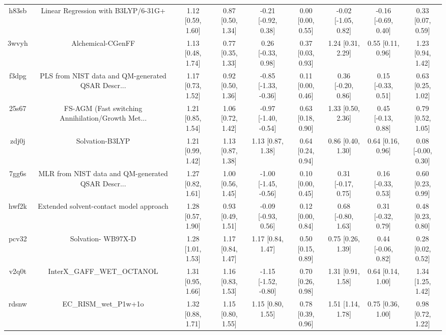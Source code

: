 \documentclass{article}
\begin{document}
\begin{center}
\begin{longtable}{|ccccccccc|}
 h83sb &                Linear Regression with B3LYP/6-31G+ &  1.12 [0.59, 1.60] &  0.87 [0.50, 1.34] &   -0.21 [-0.92, 0.38] &  0.00 [0.00, 0.55] &  -0.02 [-1.05, 0.82] &  -0.16 [-0.69, 0.40] &     0.33 [0.07, 0.59] \\
 3wvyh &                                  Alchemical-CGenFF &  1.13 [0.48, 1.74] &  0.77 [0.35, 1.33] &    0.26 [-0.33, 0.98] &  0.37 [0.03, 0.93] &    1.24 [0.31, 2.29] &    0.55 [0.11, 0.96] &     1.23 [0.94, 1.42] \\
 f3dpg &  PLS from NIST data and QM-generated QSAR Descr... &  1.17 [0.73, 1.52] &  0.92 [0.50, 1.36] &  -0.85 [-1.33, -0.36] &  0.11 [0.00, 0.46] &   0.36 [-0.20, 0.86] &   0.15 [-0.33, 0.51] &     0.63 [0.25, 1.02] \\
 25s67 &  FS-AGM (Fast switching Annihilation/Growth Met... &  1.21 [0.85, 1.54] &  1.06 [0.72, 1.42] &  -0.97 [-1.40, -0.54] &  0.63 [0.18, 0.90] &    1.33 [0.50, 2.36] &   0.45 [-0.13, 0.88] &     0.79 [0.52, 1.05] \\
 zdj0j &                                    Solvation-B3LYP &  1.21 [0.99, 1.42] &  1.13 [0.87, 1.38] &     1.13 [0.87, 1.38] &  0.64 [0.24, 0.94] &    0.86 [0.40, 1.30] &    0.64 [0.16, 0.96] &    0.08 [-0.00, 0.30] \\
 7gg6s &  MLR from NIST data and QM-generated QSAR Descr... &  1.27 [0.82, 1.61] &  1.00 [0.56, 1.45] &  -1.00 [-1.45, -0.56] &  0.10 [0.00, 0.45] &   0.31 [-0.17, 0.75] &   0.16 [-0.33, 0.53] &     0.60 [0.23, 0.99] \\
 hwf2k &            Extended solvent-contact model approach &  1.28 [0.57, 1.90] &  0.93 [0.49, 1.51] &   -0.09 [-0.93, 0.56] &  0.12 [0.00, 0.84] &   0.68 [-0.80, 1.63] &   0.31 [-0.32, 0.79] &     0.48 [0.23, 0.80] \\
 pcv32 &                                 Solvation- WB97X-D &  1.28 [1.01, 1.53] &  1.17 [0.84, 1.47] &     1.17 [0.84, 1.47] &  0.50 [0.15, 0.89] &    0.75 [0.26, 1.39] &   0.44 [-0.06, 0.82] &     0.28 [0.02, 0.52] \\
 v2q0t &                         InterX\_GAFF\_WET\_OCTANOL &  1.31 [0.95, 1.66] &  1.16 [0.83, 1.53] &  -1.15 [-1.52, -0.80] &  0.70 [0.26, 0.98] &    1.31 [0.91, 1.58] &    0.64 [0.14, 1.00] &     1.34 [1.25, 1.42] \\
 rdsnw &                              EC\_RISM\_wet\_P1w+1o &  1.32 [0.88, 1.71] &  1.15 [0.80, 1.55] &     1.15 [0.80, 1.55] &  0.78 [0.39, 0.96] &    1.51 [1.14, 1.78] &    0.75 [0.36, 1.00] &     0.98 [0.72, 1.22] \\

\end{longtable}
\end{center}
\end{document}
